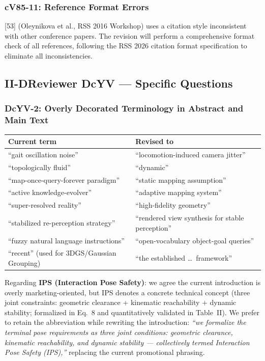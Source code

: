 \documentclass[10pt,a4paper]{article}
\begin{document}
\subsubsection*{cV85-11: Reference Format Errors}

[53] (Oleynikova et al., RSS 2016 Workshop) uses a citation style inconsistent with other conference papers. The revision will perform a comprehensive format check of all references, following the RSS 2026 citation format specification to eliminate all inconsistencies.

\subsection*{II-D\enspace Reviewer DcYV --- Specific Questions}

\subsubsection*{DcYV-2: Overly Decorated Terminology in Abstract and Main Text}

\begin{table}[h]
\centering\small
\begin{tabular}{L{5.5cm}L{7cm}}
\toprule
\textbf{Current term} & \textbf{Revised to}\\
\midrule
``gait oscillation noise'' & ``locomotion-induced camera jitter''\\
``topologically fluid'' & ``dynamic''\\
``map-once-query-forever paradigm'' & ``static mapping assumption''\\
``active knowledge-evolver'' & ``adaptive mapping system''\\
``super-resolved reality'' & ``high-fidelity geometry''\\
``stabilized re-perception strategy'' & ``rendered view synthesis for stable perception''\\
``fuzzy natural language instructions'' & ``open-vocabulary object-goal queries''\\
``recent'' (used for 3DGS/Gaussian Grouping) & ``the established \ldots\ framework''\\
\bottomrule
\end{tabular}
\end{table}

Regarding \textbf{IPS (Interaction Pose Safety)}: we agree the current introduction is overly marketing-oriented, but IPS denotes a concrete technical concept (three joint constraints: geometric clearance + kinematic reachability + dynamic stability; formalized in Eq.~8 and quantitatively validated in Table~II). We prefer to retain the abbreviation while rewriting the introduction: \textit{``we formalize the terminal pose requirements as three joint conditions: geometric clearance, kinematic reachability, and dynamic stability --- collectively termed Interaction Pose Safety (IPS),''}
replacing the current promotional phrasing.
\end{document}
